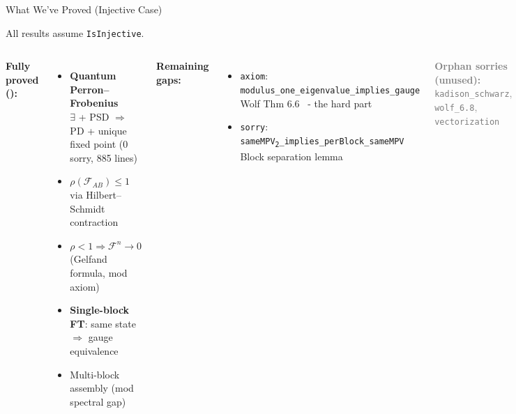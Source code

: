\documentclass[aspectratio=169,10pt]{beamer}
\begin{document}
\begin{frame}{What We've Proved (Injective Case)}
    \vspace{-0.5em}

    {\small All results assume \texttt{\textcolor{amber}{IsInjective}}.}

    \vspace{0.3em}
    \begin{columns}[T]
        \textbf{\textcolor{leangreen}{Fully proved (\checkmark):}}
        \begin{itemize}\itemsep0.15em\small
            \item[\textcolor{leangreen}{\checkmark}] \textbf{Quantum Perron--Frobenius}\\
                {\tiny $\exists$ + PSD $\Rightarrow$ PD + unique fixed point (0 sorry, 885 lines)}
            \item[\textcolor{leangreen}{\checkmark}] $\rho(\mathcal{F}_{AB}) \leq 1$ via Hilbert--Schmidt contraction
            \item[\textcolor{leangreen}{\checkmark}] $\rho < 1 \Rightarrow \mathcal{F}^n \to 0$ (Gelfand formula, mod axiom)
            \item[\textcolor{leangreen}{\checkmark}] \textbf{Single-block FT}: same state $\Rightarrow$ gauge equivalence
            \item[\textcolor{leangreen}{\checkmark}] Multi-block assembly (mod spectral gap)
        \end{itemize}

        \textbf{\textcolor{softred}{Remaining gaps:}}
        \begin{itemize}\itemsep0.15em\small
            \item[\textcolor{softred}{$\boldsymbol\times$}] \textcolor{softred}{\texttt{axiom}}: \texttt{modulus\_one\_eigenvalue\_implies\_gauge}\\
                {\tiny Wolf Thm 6.6~\cite{Wolf2012Quantum} - the hard part}
            \item[\textcolor{softred}{$\boldsymbol\times$}] \textcolor{softred}{\texttt{sorry}}: \texttt{sameMPV\textsubscript{2}\_implies\_perBlock\_sameMPV}\\
                {\tiny Block separation lemma}
        \end{itemize}

        \vspace{0.5em}
        \textbf{\textcolor{gray}{Orphan sorries (unused):}}\\
        {\tiny \textcolor{gray}{\texttt{kadison\_schwarz}, \texttt{wolf\_6.8}, \texttt{vectorization}}}
    \end{columns}


\end{frame}
\end{document}
